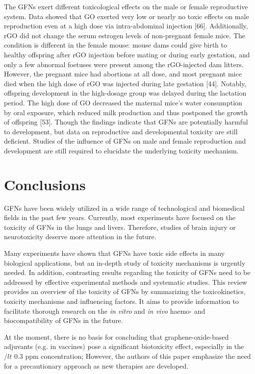 \documentclass[twoside,twocolumn,9pt]{article}
\begin{document}
The GFNs exert different toxicological effects on the male or female reproductive system. Data showed that GO exerted very low or nearly no toxic effects on male reproduction even at a high dose via intra-abdominal injection [66]. Additionally, rGO did not change the serum estrogen levels of non-pregnant female mice. The condition is different in the female mouse: mouse dams could give birth to healthy offspring after rGO injection before mating or during early gestation, and only a few abnormal foetuses were present among the rGO-injected dam litters. However, the pregnant mice had abortions at all dose, and most pregnant mice died when the high dose of rGO was injected during late gestation [44]. Notably, offspring development in the high-dosage group was delayed during the lactation period. The high dose of GO decreased the maternal mice’s water consumption by oral exposure, which reduced milk production and thus postponed the growth of offspring [53]. Though the findings indicate that GFNs are potentially harmful to development, but data on reproductive and developmental toxicity are still deficient. Studies of the influence of GFNs on male and female reproduction and development are still required to elucidate the underlying toxicity mechanism.

\section{Conclusions}
GFNs have been widely utilized in a wide range of technological and biomedical fields in the past few years. Currently, most experiments have focused on the toxicity of GFNs in the lungs and livers. Therefore, studies of brain injury or neurotoxicity deserve more attention in the future. 

Many experiments have shown that GFNs have toxic side effects in many biological applications, but an in-depth study of toxicity mechanisms is urgently needed. In addition, contrasting results regarding the toxicity of GFNs need to be addressed by effective experimental methods and systematic studies. This review provides an overview of the toxicity of GFNs by summarizing the toxicokinetics, toxicity mechanisms and influencing factors. It aims to provide information to facilitate thorough research on the \textit{in vitro} and \textit{in vivo} haemo- and biocompatibility of GFNs in the future. 

At the moment, there is no basis for concluding that graphene-oxide-based adjuvants (e.g. in vaccines) pose a significant biotoxicity effect, especially in the $/lt$ 0.3 ppm concentration; However, the authors of this paper emphasize the need for a precautionary approach as new therapies are developed.
\end{document}
